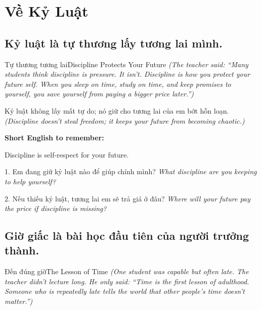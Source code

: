 \chapter{Về Kỷ Luật}

\section{Kỷ luật là tự thương lấy tương lai mình.}
\begin{truyen}{Tự thương tương lai}{Discipline Protects Your Future}
\textit{(The teacher said: ``Many students think discipline is pressure. It isn't. Discipline is how you protect your future self. When you sleep on time, study on time, and keep promises to yourself, you save yourself from paying a bigger price later.'')}
\end{truyen}

\begin{baihoc}
Kỷ luật không lấy mất tự do; nó giữ cho tương lai của em bớt hỗn loạn.
\textit{(Discipline doesn't steal freedom; it keeps your future from becoming chaotic.)}
\end{baihoc}

\begin{ghinhoanh}
\textbf{Short English to remember:}

Discipline is self-respect for your future.

\end{ghinhoanh}

\begin{tuhocnhanh}
1. Em đang giữ kỷ luật nào để giúp chính mình? \textit{What discipline are you keeping to help yourself?}

2. Nếu thiếu kỷ luật, tương lai em sẽ trả giá ở đâu? \textit{Where will your future pay the price if discipline is missing?}
\end{tuhocnhanh}
\ngancach

\section{Giờ giấc là bài học đầu tiên của người trưởng thành.}
\begin{truyen}{Đến đúng giờ}{The Lesson of Time}
\textit{(One student was capable but often late. The teacher didn't lecture long. He only said: ``Time is the first lesson of adulthood. Someone who is repeatedly late tells the world that other people's time doesn't matter.'')}
\end{truyen}

